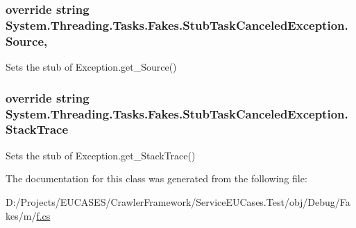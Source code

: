 \hypertarget{class_system_1_1_threading_1_1_tasks_1_1_fakes_1_1_stub_task_canceled_exception_a88b3c9bb75bf336318bd4a8a370e7d7c}{
\subsubsection[{Source}]{\setlength{\rightskip}{0pt plus 5cm}override string System.\-Threading.\-Tasks.\-Fakes.\-Stub\-Task\-Canceled\-Exception.\-Source\hspace{0.3cm}{\ttfamily [get]}, {\ttfamily [set]}}}\label{class_system_1_1_threading_1_1_tasks_1_1_fakes_1_1_stub_task_canceled_exception_a88b3c9bb75bf336318bd4a8a370e7d7c}


Sets the stub of Exception.\-get\-\_\-\-Source()

\hypertarget{class_system_1_1_threading_1_1_tasks_1_1_fakes_1_1_stub_task_canceled_exception_a8b1b276d8c05b6a89183aa720e110fc7}{
\subsubsection[{Stack\-Trace}]{\setlength{\rightskip}{0pt plus 5cm}override string System.\-Threading.\-Tasks.\-Fakes.\-Stub\-Task\-Canceled\-Exception.\-Stack\-Trace\hspace{0.3cm}{\ttfamily [get]}}}\label{class_system_1_1_threading_1_1_tasks_1_1_fakes_1_1_stub_task_canceled_exception_a8b1b276d8c05b6a89183aa720e110fc7}


Sets the stub of Exception.\-get\-\_\-\-Stack\-Trace()



The documentation for this class was generated from the following file\-:\begin{DoxyCompactItemize}
\item 
D\-:/\-Projects/\-E\-U\-C\-A\-S\-E\-S/\-Crawler\-Framework/\-Service\-E\-U\-Cases.\-Test/obj/\-Debug/\-Fakes/m/\hyperlink{m_2f_8cs}{f.\-cs}\end{DoxyCompactItemize}
